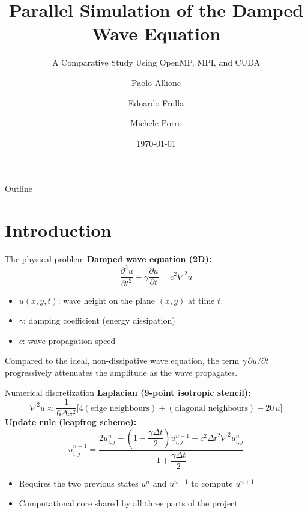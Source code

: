 \documentclass[11pt,aspectratio=169]{beamer}
\title[Parallel Simulation of the Damped Wave Equation]
{Parallel Simulation of the Damped Wave Equation}
\subtitle{A Comparative Study Using OpenMP, MPI, and CUDA}
\author[Allione, Frulla, Porro]{Paolo Allione \and Edoardo Frulla
\and Michele Porro}
\institute[PoliTO]{Quantum Engineering -- High Performance
Computing\\Academic Year 2025--26}
\date{\today}
\begin{document}
\begin{frame}
  \titlepage
\end{frame}

\begin{frame}{Outline}
  \tableofcontents
\end{frame}

\section{Introduction}

\begin{frame}{The physical problem}
  \textbf{Damped wave equation (2D):}
  \[
    \frac{\partial^2 u}{\partial t^2} + \gamma \frac{\partial
    u}{\partial t} = c^2 \nabla^2 u
  \]
  \begin{itemize}
    \item $u(x,y,t)$: wave height on the plane $(x,y)$ at time $t$
    \item $\gamma$: damping coefficient (energy dissipation)
    \item $c$: wave propagation speed
  \end{itemize}
  \vspace{0.3cm}
  Compared to the ideal, non-dissipative wave equation, the term
  $\gamma \, \partial u/\partial t$ progressively attenuates the
  amplitude as the wave propagates.
\end{frame}

\begin{frame}{Numerical discretization}
  \textbf{Laplacian (9-point isotropic stencil):}
  \[
    \nabla^2 u \approx \frac{1}{6\Delta x^2}\Big[4(\text{edge
    neighbours}) + (\text{diagonal neighbours}) - 20\,u\Big]
  \]
  \textbf{Update rule (leapfrog scheme):}
  \[
    u^{n+1}_{i,j} = \frac{2u^n_{i,j} - \left(1-\dfrac{\gamma\Delta
      t}{2}\right)u^{n-1}_{i,j} + c^2\Delta t^2 \nabla^2
    u^n_{i,j}}{1+\dfrac{\gamma\Delta t}{2}}
  \]
  \begin{itemize}
    \item Requires the two previous states $u^n$ and $u^{n-1}$ to
      compute $u^{n+1}$
    \item Computational core shared by all three parts of the project
  \end{itemize}
\end{frame}

\end{document}
